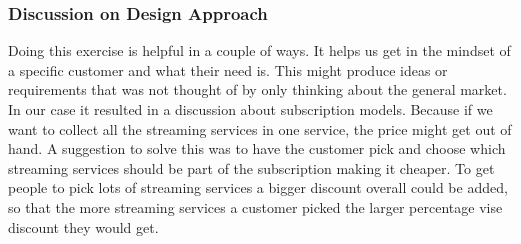 \subsubsection{Discussion on Design Approach}
Doing this exercise is helpful in a couple of ways. It helps us get in the mindset of a specific customer and what their need is. This might produce ideas or requirements that was not thought of by only thinking about the general market. In our case it resulted in a discussion about subscription models. Because if we want to collect all the streaming services in one service, the price might get out of hand. A suggestion to solve this was to have the customer pick and choose which streaming services should be part of the subscription making it cheaper. To get people to pick lots of streaming services a bigger discount overall could be added, so that the more streaming services a customer picked the larger percentage vise discount they would get.


